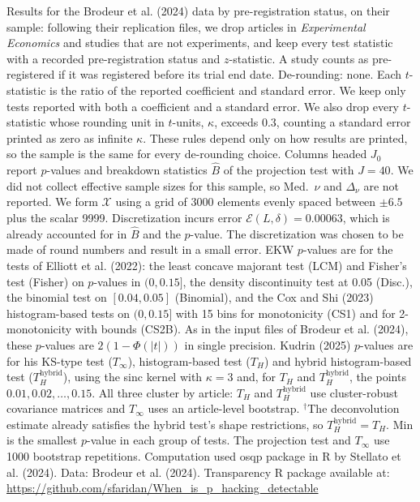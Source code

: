 \begin{table}[htbp]
\medskip
\begin{minipage}{\linewidth}
Results for the Brodeur et al. (2024) data by pre-registration status, on their sample: following their replication files, we drop articles in \textit{Experimental Economics} and studies that are not experiments, and keep every test statistic with a recorded pre-registration status and $z$-statistic.
A study counts as pre-registered if it was registered before its trial end date.
De-rounding: none. Each $t$-statistic is the ratio of the reported coefficient and standard error.
We keep only tests reported with both a coefficient and a standard error. We also drop every $t$-statistic whose rounding unit in $t$-units, $\kappa$, exceeds 0.3, counting a standard error printed as zero as infinite $\kappa$. These rules depend only on how results are printed, so the sample is the same for every de-rounding choice.
Columns headed $J_0$ report $p$-values and breakdown statistics $\widehat{B}$ of the projection test with $J=40$.
We did not collect effective sample sizes for this sample, so Med.\ $\nu$ and $\Delta_\nu$ are not reported.
We form $\mathcal{X}$ using a grid of 3000 elements evenly spaced between $\pm 6.5$ plus the scalar 9999.
Discretization incurs error $\mathcal{E}(L,\delta)=0.00063$, which is already accounted for in $\widehat{B}$ and the $p$-value.
The discretization was chosen to be made of round numbers and result in a small error.
EKW $p$-values are for the tests of Elliott et al. (2022): the least concave majorant test (LCM) and Fisher's test (Fisher) on $p$-values in $(0,0.15]$, the density discontinuity test at 0.05 (Disc.), the binomial test on $[0.04,0.05]$ (Binomial), and the Cox and Shi (2023) histogram-based tests on $(0,0.15]$ with 15 bins for monotonicity (CS1) and for 2-monotonicity with bounds (CS2B).
As in the input files of Brodeur et al. (2024), these $p$-values are $2(1-\Phi(|t|))$ in single precision.
Kudrin (2025) $p$-values are for his KS-type test ($T_\infty$), histogram-based test ($T_H$) and hybrid histogram-based test ($T_H^{\mathrm{hybrid}}$), using the sinc kernel with $\kappa=3$ and, for $T_H$ and $T_H^{\mathrm{hybrid}}$, the points $0.01,0.02,\ldots,0.15$.
All three cluster by article: $T_H$ and $T_H^{\mathrm{hybrid}}$ use cluster-robust covariance matrices and $T_\infty$ uses an article-level bootstrap.
$^\dagger$The deconvolution estimate already satisfies the hybrid test's shape restrictions, so $T_H^{\mathrm{hybrid}}=T_H$.
Min is the smallest $p$-value in each group of tests.
The projection test and $T_\infty$ use 1000 bootstrap repetitions.
Computation used osqp package in R by Stellato et al. (2024). Data: Brodeur et al. (2024).
Transparency R package available at: \url{https://github.com/sfaridan/When_is_p_hacking_detectable}
\end{minipage}
\end{table}
